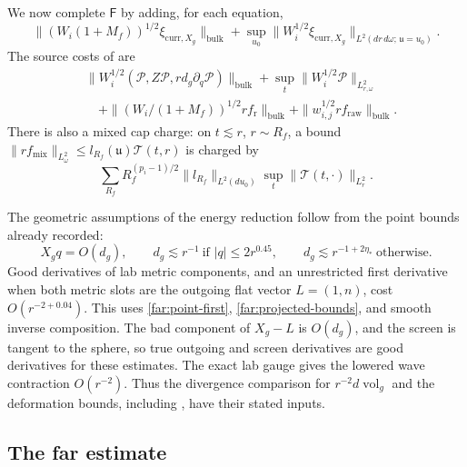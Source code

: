 We now complete $\mathsf F$ by adding, for each equation,
\begin{equation}\label{far:corrected-norm}
 \|(W_i(1+M_f))^{1/2}\xi_{\mathrm{curr},X_g}\|_{\mathrm{bulk}}
 +\sup_{u_0}\|W_i^{1/2}\xi_{\mathrm{curr},X_g}
                   \|_{L^2(dr\,d\omega;\,\mathfrak u=u_0)}.
\end{equation}
The source costs of  are
\begin{equation}\label{far:source-costs}
 \begin{split}
 &\|W_i^{1/2}(\mathcal P,Z\mathcal P,rd_g\partial_q\mathcal P)
                                                    \|_{\mathrm{bulk}}
       +\sup_t\|W_i^{1/2}\mathcal P\|_{L^2_{r,\omega}}\\
 &\quad+\|(W_i/(1+M_f))^{1/2}rf_{\mathrm r}\|_{\mathrm{bulk}}
       +\|w_{i,j}^{1/2}rf_{\mathrm{raw}}\|_{\mathrm{bulk}}.
 \end{split}
\end{equation}
There is also a mixed cap charge: on $t\lesssim r$, $r\sim R_f$, a bound
$\|rf_{\mathrm{mix}}\|_{L^2_\omega}
\le l_{R_f}(\mathfrak u)\mathcal T(t,r)$ is charged by
\begin{equation}\label{far:mixed-charge}
 \sum_{R_f}R_f^{(p_i-1)/2}\|l_{R_f}\|_{L^2(du_0)}
                            \sup_t\|\mathcal T(t,\cdot)\|_{L^2_r}.
\end{equation}

The geometric assumptions of the energy reduction follow from the
point bounds already recorded:
\[
 X_gq=O(d_g),\qquad
 d_g\lesssim r^{-1}\ \text{if }|q|\le2r^{0.45},\qquad
 d_g\lesssim r^{-1+2\eta_*}\ \text{otherwise}.
\]
Good derivatives of lab metric components, and an unrestricted first
derivative when both metric slots are the outgoing flat vector
$L=(1,n)$, cost $O(r^{-2+0.04})$.  This uses
\eqref{far:point-first}, \eqref{far:projected-bounds}, and smooth inverse
composition.  The bad component of $X_g-L$ is $O(d_g)$, and the screen
is tangent to the sphere, so true outgoing and screen derivatives are
good derivatives for these estimates.  The exact lab gauge gives the
lowered wave contraction $O(r^{-2})$.  Thus the divergence comparison
for $r^{-2}d\operatorname{vol}_g$ and the deformation bounds, including
, have their stated inputs.

\subsection{The far estimate}


